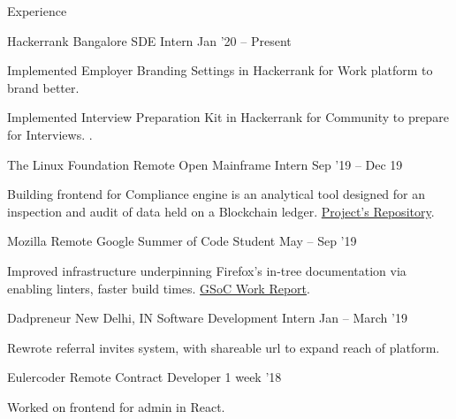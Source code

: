 \documentclass{resume} %
\begin{document}
\begin{rSection}{Experience}
    \begin{rWorkSection}{Hackerrank}
                           {Bangalore}
                           {SDE Intern}
                           {Jan '20 -- Present}
  {
    \item Implemented Employer Branding Settings in Hackerrank for Work platform to brand better.
    \item Implemented Interview Preparation Kit in Hackerrank for Community to prepare for Interviews.
.
  }
  \end{rWorkSection}

  \begin{rWorkSection}{The Linux Foundation}
                           {Remote}
                           {Open Mainframe Intern}
                           {Sep '19 -- Dec 19}
  {
    \item Building frontend for Compliance engine is an analytical tool designed for an inspection and audit of data held on a Blockchain ledger. \href{https://github.com/openmainframeproject-internship/Compliance-Engine-2019/}{Project's Repository}.
  }
  \end{rWorkSection}

  \begin{rWorkSection}{Mozilla}
                      {Remote}
                      {Google Summer of Code Student}
                      {May -- Sep '19}
  {
    \item Improved infrastructure underpinning Firefox's in-tree documentation via enabling linters, faster build times. \href{http://bit.ly/GSoC19FF}{GSoC Work Report}.
  }
  \end{rWorkSection}

  \begin{rWorkSection}{Dadpreneur}
                     {New Delhi, IN}
                     {Software Development Intern}
                     {Jan -- March '19}
  {
    \item Rewrote referral invites system, with shareable url to expand reach of platform.
  }
  \end{rWorkSection}

  \begin{rWorkSection}{Eulercoder}
                     {Remote}
                     {Contract Developer}
                     {1 week '18}
  {
    \item Worked on frontend for admin in React.
  }
  \end{rWorkSection}
\end{rSection}
\end{document}
